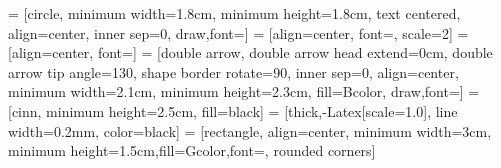 \setlength{\tabcolsep}{2pt}

\usepackage{amsmath}
\DeclareMathOperator\arctanh{arctanh} 
\DeclareMathOperator\softplus{Softplus}%

\usepackage{amsthm} 		%
\theoremstyle{definition}
\newtheorem{definition}{Definition}[section]

\usetikzlibrary{arrows, shapes.geometric, arrows.meta, shapes, decorations.pathreplacing, fit, patterns, patterns.meta}


 = [circle, minimum width=1.8cm, minimum height=1.8cm, text centered, align=center, inner sep=0, draw,font=\Large]
 = [align=center, font=\Huge, scale=2]
 = [align=center, font=\Large]
 = [double arrow, double arrow head extend=0cm, double arrow tip angle=130, shape border rotate=90, inner sep=0, align=center, minimum width=2.1cm, minimum height=2.3cm, fill=Bcolor, draw,font=\Large]
 = [cinn, minimum height=2.5cm, fill=black]
 = [thick,-{Latex[scale=1.0]}, line width=0.2mm, color=black]
 = [rectangle, align=center,  minimum width=3cm, minimum height=1.5cm,fill=Gcolor,font=\Large, rounded corners]
